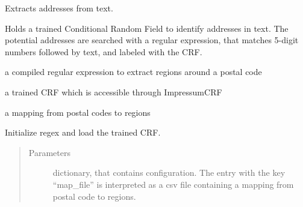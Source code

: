 \documentclass[letterpaper,10pt,english]{sphinxmanual}
\begin{document}
\begin{fulllineitems}
\label{\detokenize{api:impressum.Impressum_handler}}
Extracts addresses from text.

Holds a trained Conditional Random Field to identify addresses in
text. The potential addresses are searched with a regular
expression, that matches 5-digit numbers followed by text, and
labeled with the CRF.

\begin{fulllineitems}
\label{\detokenize{api:impressum.Impressum_handler.regex}}
a compiled regular expression to extract regions around a
postal code

\end{fulllineitems}


\begin{fulllineitems}
\label{\detokenize{api:impressum.Impressum_handler.imp}}
a trained CRF which is accessible through ImpressumCRF

\end{fulllineitems}


\begin{fulllineitems}
\label{\detokenize{api:impressum.Impressum_handler.kr_mapping}}
a mapping from postal codes to regions

\end{fulllineitems}


\begin{fulllineitems}
\label{\detokenize{api:impressum.Impressum_handler.__init__}}
Initialize regex and load the trained CRF.
\begin{quote}\begin{description}
\item[{Parameters}] \leavevmode
{} \textendash{} dictionary, that contains configuration. The entry
with the key “map\_file” is interpreted as a csv file
containing a mapping from postal code to regions.


\end{description}
\end{quote}
\end{fulllineitems}
\end{fulllineitems}
\end{document}
